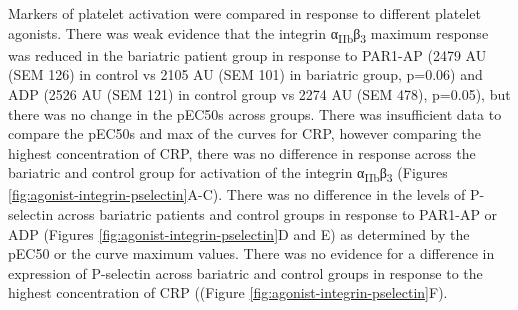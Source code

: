 \documentclass[11pt,twoside]{bristolthesis}
\begin{document}
Markers of platelet activation were compared in response to different platelet agonists. There was weak evidence that the integrin α\textsubscript{IIb}β\textsubscript{3} maximum response was reduced in the bariatric patient group in response to PAR1-AP (2479 AU (SEM 126) in control vs 2105 AU (SEM 101) in bariatric group, p=0.06) and ADP (2526 AU (SEM 121) in control group vs 2274 AU (SEM 478), p=0.05), but there was no change in the pEC50s across groups. There was insufficient data to compare the pEC50s and max of the curves for CRP, however comparing the highest concentration of CRP, there was no difference in response across the bariatric and control group for activation of the integrin α\textsubscript{IIb}β\textsubscript{3} (Figures \ref{fig:agonist-integrin-pselectin}A-C). There was no difference in the levels of P-selectin across bariatric patients and control groups in response to PAR1-AP or ADP (Figures \ref{fig:agonist-integrin-pselectin}D and E) as determined by the pEC50 or the curve maximum values. There was no evidence for a difference in expression of P-selectin across bariatric and control groups in response to the highest concentration of CRP ((Figure \ref{fig:agonist-integrin-pselectin}F).
\end{document}
